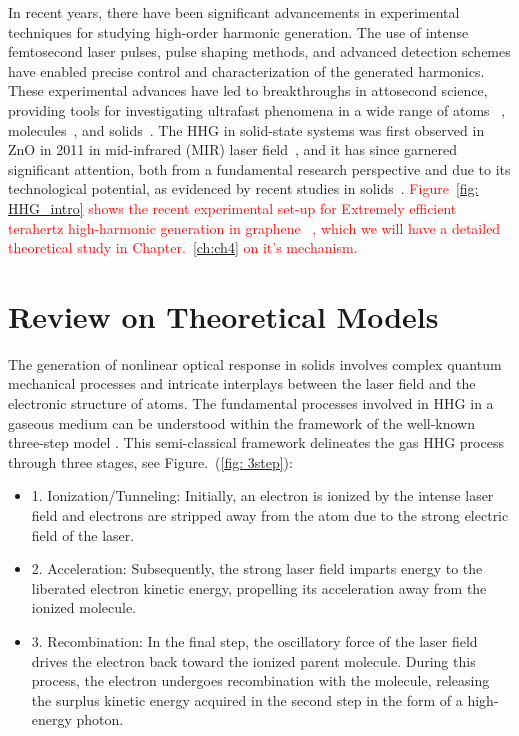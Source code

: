 In recent years, there have been significant advancements in experimental techniques for studying high-order harmonic generation. The use of intense femtosecond laser pulses, pulse shaping methods, and advanced detection schemes have enabled precise control and characterization of the generated harmonics. These experimental advances have led to breakthroughs in attosecond science, providing tools for investigating ultrafast phenomena in a wide range of atoms ~\cite{Goulielmakis2010,PhysRevLett.105.143002,PhysRevLett.106.123601}, molecules~\cite{Warrick2016,Reduzzi2016,PhysRevResearch.3.043222}, and solids~\cite{doi:10.1126/science.1260311, doi:10.1126/science.aag1268, Mashiko2016,Siegrist2019, vampa2017merge}.
The HHG in solid-state systems was first observed in ZnO in 2011 in mid-infrared (MIR) laser field~\cite{Ghimire2011}, and it has since garnered significant attention, both from a fundamental research perspective and due to its technological potential, as evidenced by recent studies in solids~\cite{Ghimire2019, Silva2019, Nakagawa2022,gorlach2022high, neufeld2023there}. \textcolor{red}{Figure~\ref{fig: HHG_intro} shows the recent experimental set-up for Extremely efficient terahertz high-harmonic generation in graphene ~\cite{hafez2018extremely, kovalev2021electrical}, which we will have a detailed theoretical study in Chapter.~\ref{ch:ch4} on it's mechanism.}


\section{Review on Theoretical Models}
The generation of nonlinear optical response in solids involves complex quantum mechanical processes and intricate
interplays between the laser field and the electronic structure of atoms. The fundamental processes involved in \gls{HHG} in a gaseous medium can
be understood within the framework of the well-known three-step model  \cite{corkum1993plasma,
	lewenstein1994theory}. This semi-classical framework delineates the gas HHG process through three stages, see Figure.~(\ref{fig: 3step}):
\begin{itemize}
	\item 1. Ionization/Tunneling: Initially, an electron is ionized by the intense laser field and electrons are stripped away from the atom due to the strong electric field of the laser.

	\item 2. Acceleration: Subsequently, the strong laser field imparts energy to the liberated electron kinetic energy, propelling its acceleration away from the ionized molecule.

	\item 3. Recombination: In the final step, the oscillatory force of the laser field drives the electron back toward the ionized parent molecule. During this process, the electron undergoes recombination with the molecule, releasing the surplus kinetic energy acquired in the second step in the form of a high-energy photon.\\
\end{itemize}

